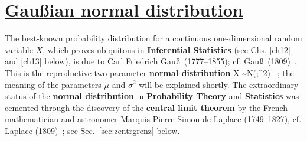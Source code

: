 \section[Gau\ss ian normal distribution]{\href{https://www.youtube.com/watch?v=8fjDkBT641o}{Gau\ss ian normal distribution}}
The best-known probability distribution for a continuous
one-dimensional random variable $X$, 
which proves ubiquitous in \textbf{Inferential Statistics} (see
Chs. \ref{ch12}  and \ref{ch13} below), is due to 
\href{http://www-groups.dcs.st-and.ac.uk/~history/Biographies/Gauss.html}{Carl Friedrich Gau\ss\ (1777--1855)}; cf. Gau\ss\ 
(1809)~. This is the reproductive two-parameter
\textbf{normal distribution}
%
\be
X \sim N(\mu;\sigma^{2}) \ ;
\ee
%
the meaning of the parameters $\mu$ and $\sigma^{2}$ will be 
explained shortly. The extraordinary status of the \textbf{normal 
distribution} in \textbf{Probability Theory} and
\textbf{Statistics} was cemented through the discovery of the
\textbf{central limit theorem} by the French mathematician and
astronomer
\href{http://www-history.mcs.st-and.ac.uk/Biographies/Laplace.html}{Marquis Pierre Simon de Laplace (1749--1827)}, cf. Laplace 
(1809)~\ct{lap1809}; see Sec.~\ref{sec:zentrgrenz} below.

